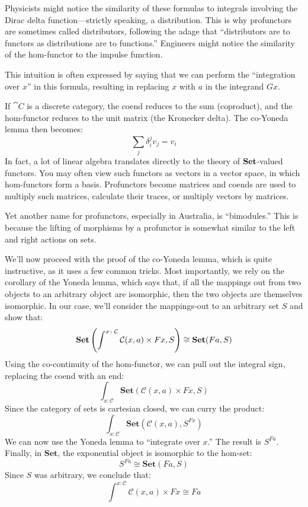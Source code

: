 \documentclass[DaoFP]{subfiles}
\begin{document}
Physicists might notice the similarity of these formulas to integrals involving the Dirac delta function---strictly speaking, a distribution. This is why profunctors are sometimes called distributors, following the adage that ``distributors are to functors as distributions are to functions.'' Engineers might notice the similarity of the hom-functor to the impulse function.

This intuition is often expressed by saying that we can perform the ``integration over $x$'' in this formula, resulting in replacing $x$ with $a$ in the integrand $G x$. 

If $\cat C$ is a discrete category, the coend reduces to the sum (coproduct), and the hom-functor reduces to the unit matrix (the Kronecker delta). The co-Yoneda lemma then becomes:
\[ \sum_j \delta_i^j v_j = v_i \]
In fact, a lot of linear algebra translates directly to the theory of $\mathbf{Set}$-valued functors. You may often view such functors as vectors in a vector space, in which hom-functors form a basis. Profunctors become matrices and coends are used to multiply such matrices, calculate their traces, or multiply vectors by matrices.

Yet another name for profunctors, especially in Australia, is ``bimodules.'' This is because the lifting of morphisms by a profunctor is somewhat similar to the left and right actions on sets. 

We'll now proceed with the proof of the co-Yoneda lemma, which is quite instructive, as it uses a few common tricks. Most importantly, we rely on the corollary of the Yoneda lemma, which says that, if all the mappings out from two objects to an arbitrary object are isomorphic, then the two objects are themselves isomorphic. In our case, we'll consider the mappings-out to an arbitrary set $S$ and show that:
\[ \mathbf{Set} \left(\int^{x \colon \mathcal{C}} \mathcal{C}(x, a) \times F x, S \right) \cong 
    \mathbf{Set} (F a, S)\]
Using the co-continuity of the hom-functor, we can pull out the integral sign, replacing the coend with an end:
\[ \int_{x \colon \mathcal{C}} \mathbf{Set} \left( \mathcal{C}(x, a) \times F x, S \right) \]
Since the category of sets is cartesian closed, we can curry the product:
\[ \int_{x \colon \mathcal{C}} \mathbf{Set} \left( \mathcal{C}(x, a) , S^{F x} \right) \]
We can now use the Yoneda lemma to ``integrate over $x$.'' The result is $S^{F a}$. Finally, in $\mathbf{Set}$, the exponential object is isomorphic to the hom-set:
\[S^{F a} \cong \mathbf{Set}(F a, S)\]
Since $S$ was arbitrary, we conclude that:
\[ \int^{x \colon \mathcal{C}} \mathcal{C}(x, a) \times F x \cong F a \]
\end{document}
